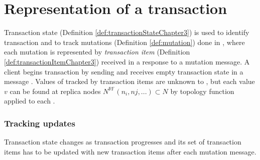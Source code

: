 
\section{Representation of a transaction}


Transaction state (Definition \ref{def:transactionStateChapter3}) is used to identify transaction \transaction and to
 track mutations (Definition \ref{def:mutation}) done in \transaction, where each mutation is represented by
 \emph{transaction item} \txItem (Definition \ref{def:transactionItemChapter3}) received in a response to a mutation message. A client \client begins transaction by sending \beginTransactionMessage and receives empty transaction state \txState in a message  \initialTxStateMessage.
Values of \mutationsFull tracked by transaction items \txItems are unknown to \txItems, but each value $v$ can be found at replica nodes
$N^{\mathbb{RF}}(n_{i},n{j},...)\subset \mathit{N}$ by topology function \topology applied to each \txItem.

\subsubsection{Tracking updates}
Transaction state \txState changes as transaction \transaction progresses and its set of transaction items has to be updated with new transaction items after each mutation message. 

